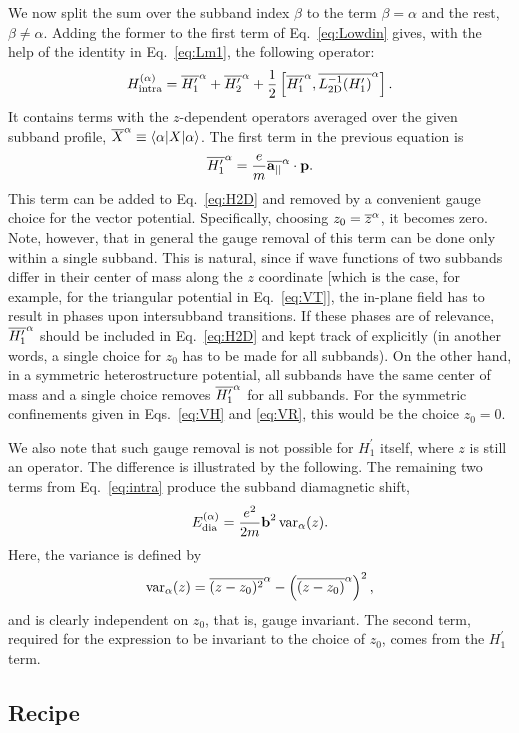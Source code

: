\documentclass[aps,floatfix,twocolumn,showpacs,10pt,nofootinbib]{revtex4-1}
\newcommand{\be}{\begin{equation}}
\newcommand{\ee}{\end{equation}}
\begin{document}
We now split the sum over the subband index $\beta$ to the term $\beta=\alpha$ and the rest, $\beta\neq \alpha$. Adding the former to the first term of Eq.~\eqref{eq:Lowdin} gives, with the help of the identity in Eq.~\eqref{eq:Lm1}, the following operator:
\be
H^{(\alpha)}_\textrm{intra} = \ave{H^\prime_1}{\alpha} + \ave{H^\prime_2}{\alpha} + \frac{1}{2} \left[ \ave{H^\prime_1}{\alpha},\ave{L_{\rm 2D}^{-1}(H^\prime_1)}{\alpha}  \right].
\label{eq:intra}
\ee
It contains terms with the $z$-dependent operators averaged over the given subband profile, $\overline{X}^{\alpha} \equiv \langle \alpha | X |\alpha \rangle$. The first term in the previous equation is
\be
\ave{H^\prime_1}{\alpha} = \frac{e}{m}\ave{\Ain}{\alpha} \cdot \Pin.
\ee
This term can be added to Eq.~\eqref{eq:H2D} and removed by a convenient gauge choice for the vector potential.
Specifically, choosing $z_0 = \overline{z}^{\alpha}$, it becomes zero. Note, however, that in general the gauge removal of this term can be done only within a single subband. This is natural, since if wave functions of two subbands differ in their center of mass along the $z$ coordinate [which is the case, for example, for the triangular potential in Eq.~\eqref{eq:VT}], the in-plane field has to result in phases upon intersubband transitions. If these phases are of relevance,\cite{choi1988:PRB,yang1997:PRL} $\overline{H^\prime_1}^{\alpha}$ should be included in Eq.~\eqref{eq:H2D} and kept track of explicitly (in another words, a single choice for $z_0$ has to be made for all subbands). On the other hand, in a symmetric heterostructure potential, all subbands have the same center of mass and a single choice removes $\overline{H^\prime_1}^{\alpha}$ for all subbands. For the symmetric confinements given in Eqs.~\eqref{eq:VH} and \eqref{eq:VR}, this would be the choice $z_0=0$.

We also note that such gauge removal is not possible for $H^\prime_1$ itself, where $z$ is still an operator. The difference is illustrated by the following. The remaining two terms from Eq.~\eqref{eq:intra} produce the subband diamagnetic shift,\cite{stern1967:PR}
\be
E_\textrm{dia}^{(\alpha)} =  \frac{e^2}{2m} \Bin^2 \, \textrm{var}_\alpha (z).
\label{eq:Ediag}
\ee
Here, the variance is defined by
\be
\textrm{var}_\alpha (z) = \ave{(z-z_0)^2}{\alpha}-\left(\ave{(z-z_0)}{\alpha}\right)^2,
\ee
and is clearly independent on $z_0$, that is, gauge invariant. The second term, required for the expression to be invariant to the choice of $z_0$, comes from the $H_1^\prime$ term.

\subsection{Recipe}
\end{document}
